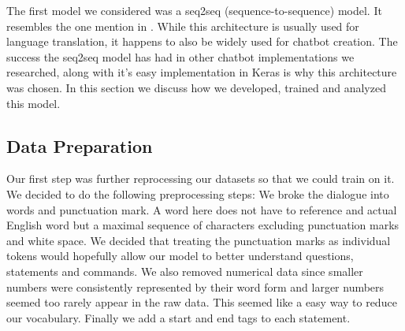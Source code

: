 The first model we considered was a seq2seq (sequence-to-sequence) model.
It resembles the one mention in \cite{denkowski:lavie:meteor-wmt:2014}. 
While this architecture is usually used for language translation, it happens to also be widely used for chatbot creation. 
The success the seq2seq model has had in other chatbot implementations we researched, along with it's easy implementation in Keras is why this architecture was chosen.
In this section we discuss how we developed, trained and analyzed this model.

\subsection{Data Preparation}
Our first step was further reprocessing our datasets so that we could train on it.
We decided to do the following preprocessing steps:
We broke the dialogue into words  and punctuation mark. 
A word here does not have to reference and actual English word but a maximal sequence of characters excluding punctuation marks and white space. 
We decided that treating the punctuation marks as individual tokens would hopefully allow our model to better understand questions, statements and commands.
We also removed numerical data since smaller numbers were consistently represented by their word form and larger numbers seemed too rarely appear in the raw data.
This seemed like a easy way to reduce our vocabulary.
Finally we add a start and end tags to each statement.


